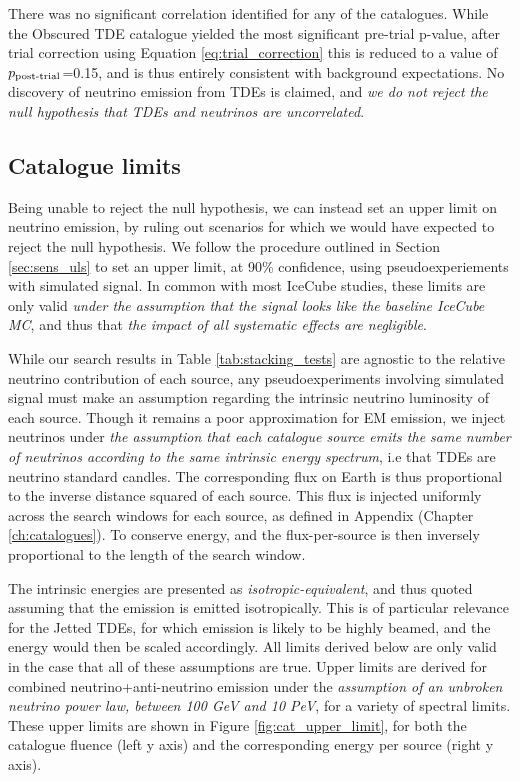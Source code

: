 There was no significant correlation identified for any of the catalogues. While the Obscured TDE catalogue yielded the most significant pre-trial p-value, after trial correction using Equation \ref{eq:trial_correction} this is reduced to a value of $p_{\textup{post-trial}}$=0.15, and is thus entirely consistent with background expectations. No discovery of neutrino emission from TDEs is claimed, and \emph{we do not reject the null hypothesis that TDEs and neutrinos are uncorrelated}.

\subsection{Catalogue limits}

Being unable to reject the null hypothesis, we can instead set an upper limit on neutrino emission, by ruling out scenarios for which we would have expected to reject the null hypothesis. We follow the procedure outlined in Section \ref{sec:sens_uls} to set an upper limit, at 90\% confidence, using pseudoexperiements with simulated signal. In common with most IceCube studies, these limits are only valid \emph{under the assumption that the signal looks like the baseline IceCube MC}, and thus that \emph{the impact of all systematic effects are negligible}.

While our search results in Table \ref{tab:stacking_tests} are agnostic to the relative neutrino contribution of each source, any pseudoexperiments involving simulated signal must make an assumption regarding the intrinsic neutrino luminosity of each source. Though it remains a poor approximation for EM emission, we inject neutrinos under \emph{the assumption that each catalogue source emits the same number of neutrinos according to the same intrinsic energy spectrum}, i.e that TDEs are neutrino standard candles. The corresponding flux on Earth is thus proportional to the inverse distance squared of each source. This flux is injected uniformly across the search windows for each source, as defined in Appendix (Chapter \ref{ch:catalogues}). To conserve energy, and the flux-per-source is then inversely proportional to the length of the search window. 

The intrinsic energies are presented as \emph{isotropic-equivalent}, and thus quoted assuming that the emission is emitted isotropically. This is of particular relevance for the Jetted TDEs, for which emission is likely to be highly beamed, and the energy would then be scaled accordingly. All limits derived below are only valid in the case that all of these assumptions are true. Upper limits are derived for combined neutrino+anti-neutrino emission under the \emph{assumption of an unbroken neutrino power law, between 100 GeV and 10 PeV}, for a variety of spectral limits. These upper limits are shown in Figure \ref{fig:cat_upper_limit}, for both the catalogue fluence (left y axis) and the corresponding energy per source (right y axis). 

